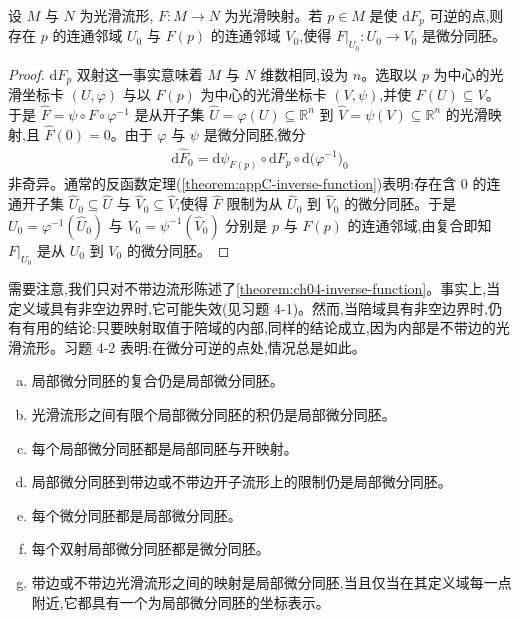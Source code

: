 \documentclass[../../main.tex]{subfiles}
\begin{document}
\begin{theorem}\label{theorem:ch04-inverse-function}
设 $M$ 与 $N$ 为光滑流形, $F:M\to N$ 为光滑映射。若 $p\in M$ 是使 $\mathrm{d}F_p$ 可逆的点,则存在 $p$ 的连通邻域 $U_0$ 与 $F(p)$ 的连通邻域 $V_0$,使得 $F|_{U_0}:U_0\to V_0$ 是微分同胚。
\end{theorem}

\begin{proof}
$\mathrm{d}F_p$ 双射这一事实意味着 $M$ 与 $N$ 维数相同,设为 $n$。选取以 $p$ 为中心的光滑坐标卡 $(U,\varphi)$ 与以 $F(p)$ 为中心的光滑坐标卡 $(V,\psi)$,并使 $F(U)\subseteq V$。于是 $\widehat{F}=\psi\circ F\circ\varphi^{-1}$ 是从开子集 $\widehat{U}=\varphi(U)\subseteq\mathbb{R}^n$ 到 $\widehat{V}=\psi(V)\subseteq\mathbb{R}^n$ 的光滑映射,且 $\widehat{F}(0)=0$。由于 $\varphi$ 与 $\psi$ 是微分同胚,微分
\begin{align*}
\mathrm{d}\widehat{F}_0=\mathrm{d}\psi_{F(p)}\circ\mathrm{d}F_p\circ\mathrm{d}\bigl(\varphi^{-1}\bigr)_0
\end{align*}
非奇异。通常的反函数定理(\cref{theorem:appC-inverse-function})表明:存在含 $0$ 的连通开子集 $\widehat{U}_0\subseteq\widehat{U}$ 与 $\widehat{V}_0\subseteq\widehat{V}$,使得 $\widehat{F}$ 限制为从 $\widehat{U}_0$ 到 $\widehat{V}_0$ 的微分同胚。于是 $U_0=\varphi^{-1}(\widehat{U}_0)$ 与 $V_0=\psi^{-1}(\widehat{V}_0)$ 分别是 $p$ 与 $F(p)$ 的连通邻域,由复合即知 $F|_{U_0}$ 是从 $U_0$ 到 $V_0$ 的微分同胚。
\end{proof}

需要注意,我们只对不带边流形陈述了\cref{theorem:ch04-inverse-function}。事实上,当定义域具有非空边界时,它可能失效(见习题 4-1)。然而,当陪域具有非空边界时,仍有有用的结论:只要映射取值于陪域的内部,同样的结论成立,因为内部是不带边的光滑流形。习题 4-2 表明:在微分可逆的点处,情况总是如此。

\begin{proposition}\label{proposition:ch04-local-diffeo-properties}
\begin{enumerate}[(a)]
\item 局部微分同胚的复合仍是局部微分同胚。
\item 光滑流形之间有限个局部微分同胚的积仍是局部微分同胚。
\item 每个局部微分同胚都是局部同胚与开映射。
\item 局部微分同胚到带边或不带边开子流形上的限制仍是局部微分同胚。
\item 每个微分同胚都是局部微分同胚。
\item 每个双射局部微分同胚都是微分同胚。
\item 带边或不带边光滑流形之间的映射是局部微分同胚,当且仅当在其定义域每一点附近,它都具有一个为局部微分同胚的坐标表示。
\end{enumerate}
\end{proposition}
\end{document}
